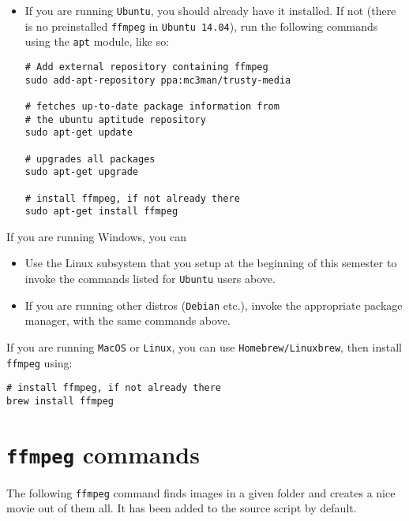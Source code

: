 \documentclass[11pt]{article}
\begin{document}
\begin{itemize}
\item If you are running \texttt{Ubuntu}, you should already have it installed. If not
(there is no preinstalled \texttt{ffmpeg} in \texttt{Ubuntu 14.04}),
run	the following commands using the \texttt{apt} module, like so:
\begin{verbatim}
# Add external repository containing ffmpeg
sudo add-apt-repository ppa:mc3man/trusty-media

# fetches up-to-date package information from
# the ubuntu aptitude repository
sudo apt-get update

# upgrades all packages
sudo apt-get upgrade

# install ffmpeg, if not already there
sudo apt-get install ffmpeg
\end{verbatim}
\end{itemize}

If you are running Windows, you can

\begin{itemize}
\item Use the Linux subsystem that you setup at the beginning of this semester to
invoke the commands listed for \texttt{Ubuntu} users above.
\item If you are running other distros (\texttt{Debian} etc.), invoke the appropriate package
manager, with the same commands above.
\end{itemize}

If you are running \texttt{MacOS} or \texttt{Linux}, you can use \texttt{Homebrew/Linuxbrew}, then
install \texttt{ffmpeg} using:
\begin{verbatim}
# install ffmpeg, if not already there
brew install ffmpeg
\end{verbatim}
\section{\texttt{ffmpeg} commands}
\label{sec:org3fa3dda}
The following \texttt{ffmpeg} command finds images in a given folder and creates a
nice movie out of them all. It has been added to the source script by default.
\end{document}
